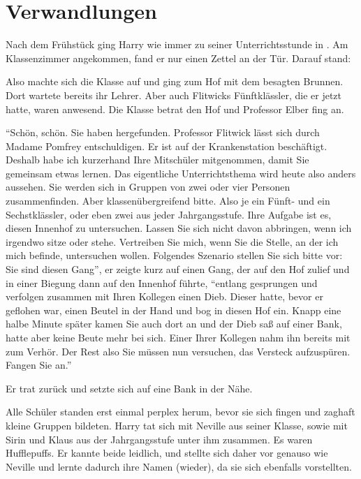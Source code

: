 \chapter{Verwandlungen}


Nach dem Frühstück ging Harry wie immer zu seiner Unterrichtsstunde in \VgddK. Am Klassenzimmer angekommen, fand er nur einen Zettel an der Tür. Darauf stand: 

Also machte sich die Klasse auf und ging zum Hof mit dem besagten Brunnen. Dort wartete bereits ihr Lehrer. Aber auch Flitwicks Fünftklässler, die er jetzt hatte, waren anwesend. Die Klasse betrat den Hof und Professor Elber fing an.

\enquote{Schön, schön. Sie haben hergefunden. Professor Flitwick lässt sich durch Madame Pomfrey entschuldigen. Er ist auf der Krankenstation beschäftigt. Deshalb habe ich kurzerhand Ihre Mitschüler mitgenommen, damit Sie gemeinsam etwas lernen. Das eigentliche Unterrichtsthema wird heute also anders aussehen. Sie werden sich in Gruppen von zwei oder vier Personen zusammenfinden. Aber klassenübergreifend bitte. Also je ein Fünft- und ein Sechstklässler, oder eben zwei aus jeder Jahrgangsstufe. \gst Ihre Aufgabe ist es, diesen Innenhof zu untersuchen. Lassen Sie sich nicht davon abbringen, wenn ich irgendwo sitze oder stehe. Vertreiben Sie mich, wenn Sie die Stelle, an der ich mich befinde, untersuchen wollen. \gst Folgendes Szenario stellen Sie sich bitte vor: Sie sind diesen Gang\abs}, er zeigte kurz auf einen Gang, der auf den Hof zulief und in einer Biegung dann auf den Innenhof führte, \enquote{\aabs entlang gesprungen und verfolgen zusammen mit Ihren Kollegen einen Dieb. Dieser hatte, bevor er geflohen war, einen Beutel in der Hand und bog in diesen Hof ein. Knapp eine halbe Minute später kamen Sie auch dort an und der Dieb saß auf einer Bank, hatte aber keine Beute mehr bei sich. Einer Ihrer Kollegen nahm ihn bereits mit zum Verhör. Der Rest \gst also Sie \gst müssen nun versuchen, das Versteck aufzuspüren. Fangen Sie an.}

Er trat zurück und setzte sich auf eine Bank in der Nähe.

Alle Schüler standen erst einmal perplex herum, bevor sie sich fingen und zaghaft kleine Gruppen bildeten. Harry tat sich mit Neville aus seiner Klasse, sowie mit Sirin und Klaus aus der Jahrgangsstufe unter ihm zusammen. Es waren Hufflepuffs. Er kannte beide leidlich, und stellte sich daher vor \gst genauso wie Neville \gst und lernte dadurch ihre Namen (wieder), da sie sich ebenfalls vorstellten.

